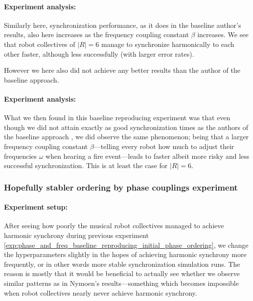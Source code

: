 			\paragraph{Experiment analysis:\nl}
			
			Similarly here, synchronization performance, as it does in the baseline author's results, also here increases as the frequency coupling constant $\beta$ increases. We see that robot collectives of $|R|=6$ manage to synchronize harmonically to each other faster, although less successfully (with larger error rates).
			
			However we here also did not achieve any better results than the author of the baseline approach.
		
			\paragraph{Experiment analysis:\nl}
			
			What we then found in this baseline reproducing experiment was that even though we did not attain exactly as good synchronization times as the authors of the baseline approach \cite{nymoen_synch}, we did observe the same phenomenon; being that a larger frequency coupling constant $\beta$—telling every robot how much to adjust their frequencies $\omega$ when hearing a fire event—leads to faster albeit more risky and less successful synchronization. This is at least the case for $|R|=6$.
		
		
		\subsubsection{Hopefully stabler ordering by phase couplings experiment}
		
			\paragraph{Experiment setup:\nl}
			
			After seeing how poorly the musical robot collectives managed to achieve harmonic synchrony during previous experiment \ref{exp:phase_and_freq_baseline_reproducing_initial_phase_ordering}, we change the hyperparameters slightly in the hopes of achieving harmonic synchrony more frequently, or in other words more stable synchronization simulation runs. The reason is mostly that it would be beneficial to actually see whether we observe similar patterns as in Nymoen's results—something which becomes impossible when robot collectives nearly never achieve harmonic synchrony.
			
